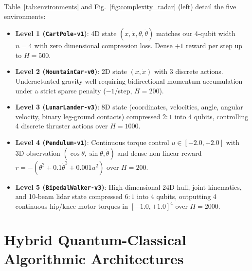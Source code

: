 \documentclass[conference]{IEEEtran}
\begin{document}
Table~\ref{tab:environments} and Fig.~\ref{fig:complexity_radar} (left) detail the five environments:
\begin{itemize}
    \item \textbf{Level 1 (\texttt{CartPole-v1})}: 4D state $(x, \dot{x}, \theta, \dot{\theta})$ matches our 4-qubit width $n=4$ with zero dimensional compression loss. Dense $+1$ reward per step up to $H=500$.
    \item \textbf{Level 2 (\texttt{MountainCar-v0})}: 2D state $(x, \dot{x})$ with 3 discrete actions. Underactuated gravity well requiring bidirectional momentum accumulation under a strict sparse penalty ($-1$/step, $H=200$).
    \item \textbf{Level 3 (\texttt{LunarLander-v3})}: 8D state (coordinates, velocities, angle, angular velocity, binary leg-ground contacts) compressed $2:1$ into 4 qubits, controlling 4 discrete thruster actions over $H=1000$.
    \item \textbf{Level 4 (\texttt{Pendulum-v1})}: Continuous torque control $u \in [-2.0, +2.0]$ with 3D observation $(\cos\theta, \sin\theta, \dot{\theta})$ and dense non-linear reward $r = -(\theta^2 + 0.1\dot{\theta}^2 + 0.001u^2)$ over $H=200$.
    \item \textbf{Level 5 (\texttt{BipedalWalker-v3})}: High-dimensional 24D hull, joint kinematics, and 10-beam lidar state compressed $6:1$ into 4 qubits, outputting 4 continuous hip/knee motor torques in $[-1.0, +1.0]^4$ over $H=2000$.
\end{itemize}

\section{Hybrid Quantum-Classical Algorithmic Architectures}
\end{document}
